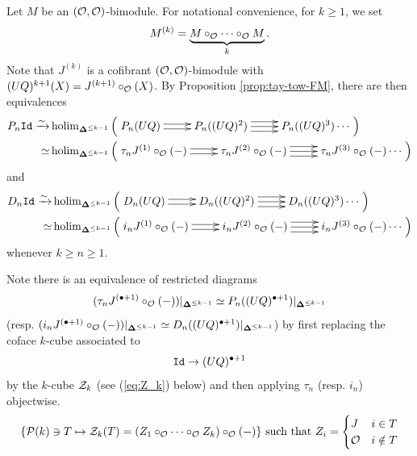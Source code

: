 Let $M$ be an $(\mathcal{O}, \mathcal{O})$-bimodule. For notational convenience, for $k\geq 1$, we set \begin{equation} \label{eq:Mcirck} 
    M^{(k)} = \underbrace{M\circ_{\mathcal{O}} \cdots \circ_{\mathcal{O}} M}_k.
    \end{equation} Note that $J^{(k)}$ is a cofibrant $(\mathcal{O}, \mathcal{O})$-bimodule with $(UQ)^{k+1}(X)= J^{(k+1)}\circ_{\mathcal{O}} (X)$. By Proposition \ref{prop:tay-tow-FM}, there are then equivalences  \begin{align*}
    P_n \Id \xrightarrow{\sim} & \holim_{\bdel^{\leq k-1}} \left( \xymatrix{
    P_n (UQ) \ar@<-.5ex>[r] \ar@<.5ex>[r] &
    P_n ((UQ)^2) \ar@<-1ex>[r] \ar[r] \ar@<1ex>[r] & 
    P_n ((UQ)^3) \cdots
    }\right)\\
      \simeq & \holim_{\bdel^{\leq k-1}} \left(\xymatrix{ 
    \tau_n J^{(1)}\circ_{\Cal{O}}(-) \ar@<.5 ex>[r] \ar@<-.5ex>[r] &
    \tau_n J^{(2)} \circ_{\Cal{O}}(-) \ar@<1 ex>[r] \ar[r] \ar@<-1 ex>[r] &
    \tau_n J^{(3)} \circ_{\Cal{O}}(-) \cdots }\right) 
\end{align*}
and \begin{align*}
    D_n \Id \xrightarrow{\sim} & \holim_{\bdel^{\leq k-1}} \left( \xymatrix{
    D_n (UQ) \ar@<-.5ex>[r] \ar@<.5ex>[r] &
    D_n ((UQ)^2)  \ar@<-1ex>[r] \ar[r] \ar@<1ex>[r] & 
    D_n ((UQ)^3) \cdots
    }\right) \\
     \simeq & \holim_{\bdel^{\leq k-1}} \left(\xymatrix{ 
    i_n J^{(1)}\circ_{\Cal{O}}(-) \ar@<.5 ex>[r] \ar@<-.5ex>[r] &
    i_n J^{(2)} \circ_{\Cal{O}}(-) \ar@<1 ex>[r] \ar[r] \ar@<-1 ex>[r] &
    i_n J^{(3)} \circ_{\Cal{O}}(-) \cdots }\right)
\end{align*}
whenever $k\geq n\geq 1$. 

Note there is an equivalence of restricted diagrams \[(\tau_n J^{(\bullet+1)}\circ_{\mathcal{O}}(-) )|_{\mathbf{\Delta}^{\leq k-1}} \simeq P_n((UQ)^{\bullet+1})|_{\mathbf{\Delta}^{\leq k-1}}\] (resp. $(i_n J^{(\bullet+1)}\circ_{\mathcal{O}}(-))|_{\mathbf{\Delta}^{\leq k-1}} \simeq D_n((UQ)^{\bullet+1})|_{\mathbf{\Delta}^{\leq k-1}}$) by first replacing the coface $k$-cube associated to \[\mathtt{Id} \to (UQ)^{\bullet+1}\] by the $k$-cube $\mathcal{Z}_k$ (see (\ref{eq:Z_k}) below) and then applying $\tau_n$ (resp. $i_n$) objectwise. \begin{equation} \label{eq:Z_k} \{\mathcal{P}(k) \ni T \mapsto \mathcal{Z}_k(T) = (Z_1 \circ_{\mathcal{O}} \cdots \circ_{\mathcal{O}} Z_k) \circ_{\mathcal{O}} (-) \}  \text{ such that $Z_i=\begin{cases} J & i\in T \\ \mathcal{O} & i \notin T \end{cases}$} \end{equation} 

